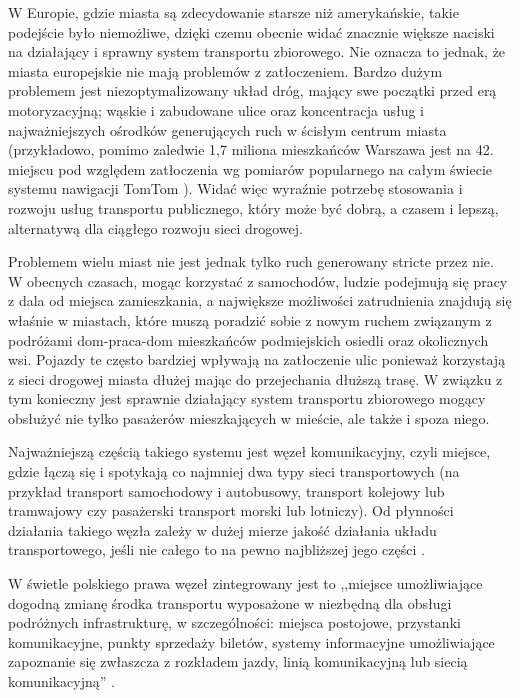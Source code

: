 \documentclass[twoside,12pt]{article}
\begin{document}
	W Europie, gdzie miasta są zdecydowanie starsze niż amerykańskie, takie podejście było niemożliwe, dzięki czemu obecnie widać znacznie większe naciski na działający i sprawny system transportu zbiorowego. Nie oznacza to jednak, że miasta europejskie nie mają problemów z zatłoczeniem. Bardzo dużym problemem jest niezoptymalizowany układ dróg, mający swe początki przed erą motoryzacyjną; wąskie i zabudowane ulice oraz koncentracja usług i najważniejszych ośrodków generujących ruch w ścisłym centrum miasta (przykładowo, pomimo zaledwie 1,7 miliona mieszkańców Warszawa jest na 42. miejscu pod względem zatłoczenia wg pomiarów popularnego na całym świecie systemu nawigacji TomTom \cite{tomtom}). Widać więc wyraźnie potrzebę stosowania i rozwoju usług transportu publicznego, który może być dobrą, a czasem i lepszą, alternatywą dla ciągłego rozwoju sieci drogowej. 
	
	Problemem wielu miast nie jest jednak tylko ruch generowany stricte przez nie. W obecnych czasach, mogąc korzystać z samochodów, ludzie podejmują się pracy z dala od miejsca zamieszkania, a największe możliwości zatrudnienia znajdują się właśnie w miastach, które muszą poradzić sobie z nowym ruchem związanym z podróżami dom-praca-dom mieszkańców podmiejskich osiedli oraz okolicznych wsi. Pojazdy te często bardziej wpływają na zatłoczenie ulic ponieważ korzystają z sieci drogowej miasta dłużej mając do przejechania dłuższą trasę. W związku z tym konieczny jest sprawnie działający system transportu zbiorowego mogący obsłużyć nie tylko pasażerów mieszkających w mieście, ale także i spoza niego. 
		
	Najważniejszą częścią takiego systemu jest węzeł komunikacyjny, czyli miejsce, gdzie łączą się i spotykają co najmniej dwa typy sieci transportowych (na przykład transport samochodowy i autobusowy, transport kolejowy lub tramwajowy czy pasażerski transport morski lub lotniczy). Od płynności działania takiego węzła zależy w dużej mierze jakość działania układu transportowego, jeśli nie całego to na pewno najbliższej jego części \cite{urbanistyka}. 
	
	W świetle polskiego prawa węzeł zintegrowany jest to ,,miejsce umożliwiające dogodną zmianę środka transportu wyposażone w niezbędną dla obsługi podróżnych infrastrukturę, w szczególności: miejsca postojowe, przystanki komunikacyjne, punkty sprzedaży biletów, systemy informacyjne umożliwiające zapoznanie się zwłaszcza z rozkładem jazdy, linią komunikacyjną lub siecią komunikacyjną'' \cite{ustawa_transport}.
	
\end{document}
